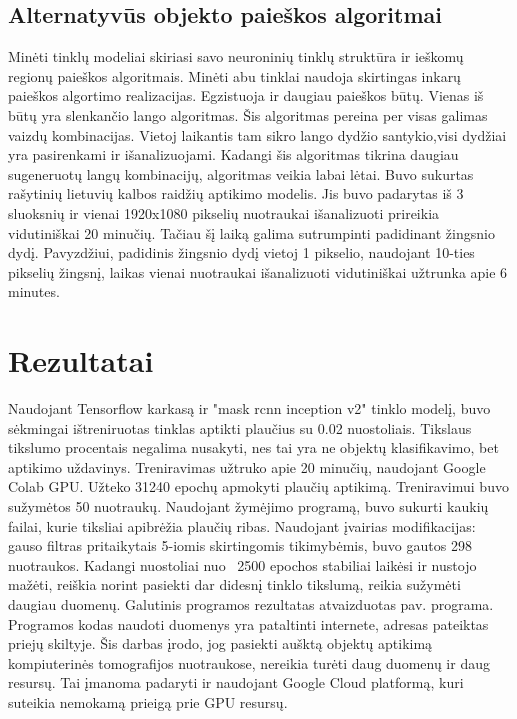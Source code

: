 \documentclass{VUMIFInfKursinis}
\begin{document}
\subsection{Alternatyvūs objekto paieškos algoritmai}
\par
Minėti tinklų modeliai skiriasi savo neuroninių tinklų struktūra ir ieškomų regionų
paieškos algoritmais. Minėti abu tinklai naudoja skirtingas inkarų paieškos algortimo
realizacijas. Egzistuoja ir daugiau paieškos būtų. Vienas iš būtų yra slenkančio lango
algoritmas. Šis algoritmas pereina per visas galimas vaizdų kombinacijas. Vietoj
laikantis tam sikro lango dydžio santykio,visi dydžiai yra pasirenkami ir išanalizuojami.
Kadangi šis algoritmas tikrina daugiau sugeneruotų langų kombinacijų, algoritmas veikia labai lėtai.
Buvo sukurtas rašytinių lietuvių kalbos raidžių aptikimo modelis. Jis buvo padarytas iš 3 sluoksnių
ir vienai 1920x1080 pikselių nuotraukai išanalizuoti prireikia vidutiniškai 20 minučių. Tačiau
šį laiką galima sutrumpinti padidinant žingsnio dydį. Pavyzdžiui, padidinis žingsnio dydį vietoj
1 pikselio, naudojant 10-ties pikselių žingsnį, laikas vienai nuotraukai išanalizuoti
vidutiniškai užtrunka apie 6 minutes.



\section{Rezultatai}
\par
Naudojant Tensorflow karkasą ir "mask rcnn inception v2" tinklo modelį, buvo sėkmingai
ištreniruotas tinklas aptikti plaučius su 0.02 nuostoliais.
Tikslaus tikslumo procentais negalima nusakyti, nes tai yra ne objektų klasifikavimo,
bet aptikimo uždavinys.
Treniravimas užtruko apie 20 minučių,
naudojant Google Colab GPU. Užteko 31240 epochų apmokyti plaučių aptikimą.
Treniravimui buvo sužymėtos 50 nuotraukų. Naudojant žymėjimo programą, buvo sukurti kaukių
failai, kurie tiksliai apibrėžia plaučių ribas. Naudojant įvairias modifikacijas:
gauso filtras pritaikytais 5-iomis skirtingomis tikimybėmis, buvo gautos 298 nuotraukos.
Kadangi nuostoliai nuo ~2500 epochos stabiliai laikėsi ir nustojo mažėti, reiškia norint
pasiekti dar didesnį tinklo tikslumą, reikia sužymėti daugiau duomenų.
Galutinis programos rezultatas atvaizduotas pav. programa. Programos kodas naudoti
duomenys yra pataltinti internete, adresas pateiktas priejų skiltyje.
Šis darbas įrodo, jog pasiekti aušktą
objektų aptikimą kompiuterinės tomografijos nuotraukose, nereikia turėti daug duomenų ir daug
resursų. Tai įmanoma padaryti ir naudojant Google Cloud platformą, kuri suteikia
nemokamą prieigą prie GPU resursų.
\end{document}

